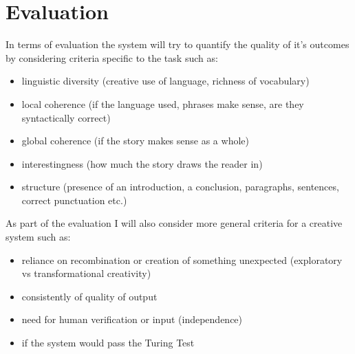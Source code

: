 \documentclass[a4paper, 12pt, notitlepage]{article}
\begin{document}
\vspace{0.2cm}

\section*{Evaluation}

In terms of evaluation the system will try to quantify the quality of it's
outcomes by considering criteria specific to the task such as:

\begin{itemize}		
  \item linguistic diversity (creative use of language, richness of vocabulary)
  \item local coherence (if the language used, phrases make sense, are they syntactically correct)
  \item global coherence (if the story makes sense as a whole)
  \item interestingness (how much the story draws the reader in)
  \item structure (presence of an introduction, a conclusion, paragraphs, sentences, correct punctuation etc.)
\end{itemize}		

\hspace{-0.75cm}
As part of the evaluation I will also consider more general criteria for a creative system such as:

\begin{itemize}		
  \item reliance on recombination or creation of something unexpected (exploratory vs transformational creativity)
  \item consistently of quality of output
  \item need for human verification or input (independence)
  \item if the system would pass the Turing Test 
\end{itemize}		
\end{document}

